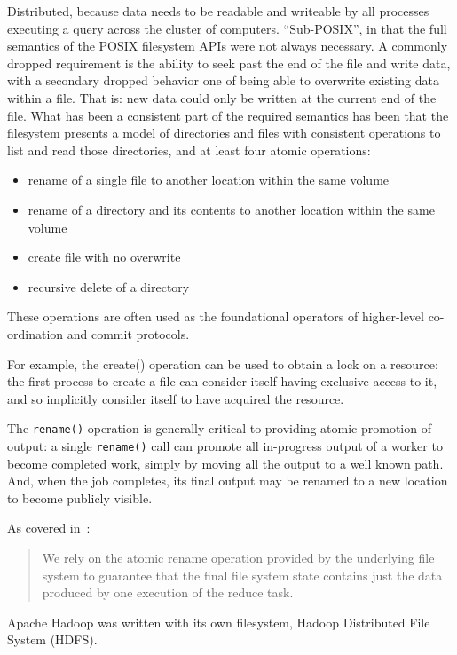 \documentclass[9pt,technote]{IEEEtran}
\begin{document}
Distributed, because data needs to be readable and writeable by all processes
executing a query across the cluster of computers.
``Sub-POSIX'', in that the full semantics of the POSIX filesystem APIs were not always necessary.
A commonly dropped requirement is the ability to seek past the end of the file and
write data, with a secondary dropped behavior one of being able to overwrite existing
data within a file.
That is: new data could only be written at the current end of the file.
What has been a consistent part of the required semantics has been that the filesystem
presents a model of directories and files with consistent operations to list and
read those directories, and at least four atomic operations:

\begin{itemize}
  \item rename of a single file to another location within the same volume 
  \item rename of a directory and its contents to another location within the same volume 
  \item create file with no overwrite 
  \item recursive delete of a directory 
\end{itemize}

These operations are often used as the foundational operators of higher-level
co-ordination and commit protocols.

For example, the create() operation can be used to obtain a lock on a resource:
the first process to create a file can consider itself having exclusive access to it,
and so implicitly consider itself to have acquired the resource.

The \texttt{rename()} operation is generally critical to providing atomic promotion
of output: a single \texttt{rename()} call can promote all in-progress output
of a worker to become completed work, simply by moving all the output to a well known path.
And, when the job completes, its final output may be renamed to a new location to become
publicly visible.

As covered in\ \cite{Dean:2004:MSD:1251254.1251264}:

\begin{quote}
We rely on the atomic rename operation provided by the underlying file system
to guarantee that the final file system state contains just the data produced
by one execution of the reduce task.
\end{quote}


Apache Hadoop was written with its own filesystem, Hadoop Distributed File System (HDFS).
\end{document}
